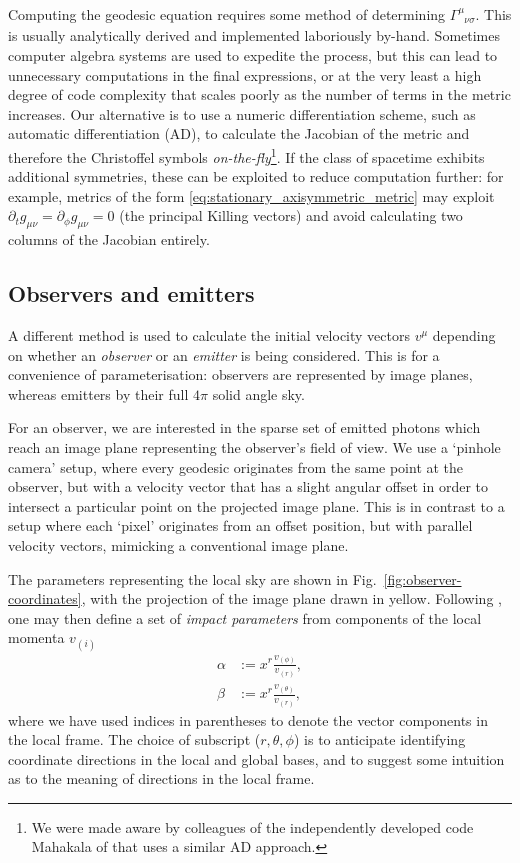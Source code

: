 \documentclass[fleqn,usenatbib]{mnras}
\newcommand{\utensor}[3]{#1^{#2}_{\phantom{#2}#3}}
\begin{document}
Computing the geodesic equation requires some method of determining
$\utensor{\Gamma}{\mu}{\nu\sigma}$. This is usually analytically derived and
implemented laboriously by-hand. Sometimes computer algebra systems are used to
expedite the process, but this can lead to unnecessary computations in the final
expressions, or at the very least a high degree of code complexity that scales
poorly as the number of terms in the metric increases. Our alternative is to use
a numeric differentiation scheme, such as automatic differentiation (AD), to
calculate the Jacobian of the metric and therefore the Christoffel symbols
\emph{on-the-fly}\footnote{We were made
    aware by colleagues of the independently developed code Mahakala of
\citet{sharma_mahakala_2023} that uses a similar AD approach.}. If the
class of spacetime exhibits additional symmetries, these can be exploited to
reduce computation further: for example, metrics of the form
\eqref{eq:stationary_axisymmetric_metric} may exploit $\partial_t g_{\mu\nu} =
\partial_{\phi} g_{\mu\nu} = 0$ (the principal Killing vectors) and avoid
calculating two columns of the Jacobian entirely.

\subsection{Observers and emitters}
\label{sec:observers-and-emitters}

A different method is used to calculate the initial velocity vectors $v^\mu$
depending on whether an \emph{observer} or an \emph{emitter} is being
considered. This is for a convenience of parameterisation: observers are
represented by image planes, whereas emitters by their full $4 \pi$ solid angle
sky.

For an observer, we are interested in the sparse set of emitted photons which
reach an image plane representing the observer's field of view. We use a
`pinhole camera' setup, where every geodesic originates from the same point at
the observer, but with a velocity vector that has a slight angular offset in
order to intersect a particular point on the projected image plane. This is in
contrast to a setup where each `pixel' originates from an offset position, but
with parallel velocity vectors, mimicking a conventional image plane.

The parameters representing the local sky are shown in
Fig.~\ref{fig:observer-coordinates}, with the projection of the image plane
drawn in yellow. Following \citet{cunningham_optical_1973}, one may then define
a set of \emph{impact parameters} from components of the local momenta $v_{(i)}$
\begin{align}
    \alpha &:=  x^r \frac{v_{(\phi)}}{v_{(r)}}, \\
    \beta &:= x^r \frac{v_{(\theta)}}{v_{(r)}},
\end{align}
where we have used indices in parentheses to denote the vector components in the
local frame. The choice of subscript ($r, \theta, \phi$) is to anticipate
identifying coordinate directions in the local and global bases, and to suggest
some intuition as to the meaning of directions in the local frame.
\end{document}
